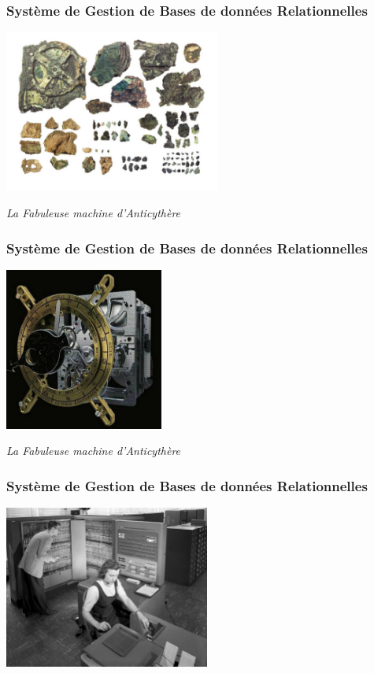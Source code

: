\documentclass{beamer}
\begin{document}
\begin{frame}
  \frametitle{Système de Gestion de Bases de données Relationnelles}

  \begin{center}
    \includegraphics[height=2.1in]{machine-d-Anticythere-c.jpg}
  \end{center}

  \vfill
  \begin{center}
    \textit{La Fabuleuse machine d'Anticythère}
  \end{center}
\end{frame}

\begin{frame}
  \frametitle{Système de Gestion de Bases de données Relationnelles}

  \begin{center}
    \includegraphics[height=2.1in]{anticy6.jpg}
  \end{center}

  \vfill
  \begin{center}
    \textit{La Fabuleuse machine d'Anticythère}
  \end{center}
\end{frame}

\begin{frame}
  \frametitle{Système de Gestion de Bases de données Relationnelles}

  \begin{center}
    \includegraphics[height=2.1in]{IBM_Electronic_Data_Processing_Machine_-_GPN-2000-001881.jpg}
  \end{center}
\end{frame}
\end{document}
